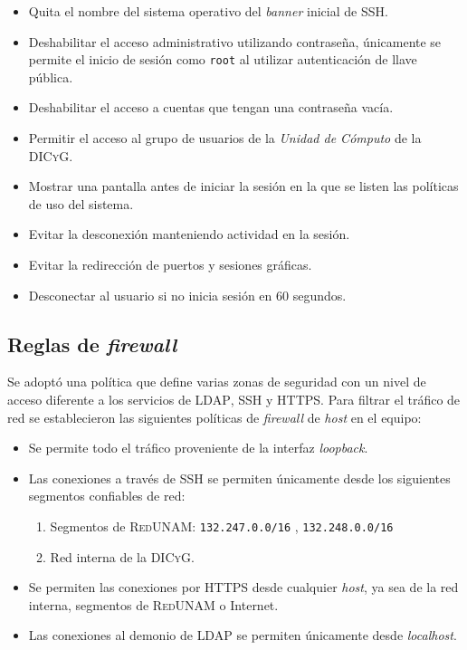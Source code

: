 \begin{itemize}
  \item Quita el nombre del sistema operativo del \textit{banner} inicial de \textsc{SSH}.
  \item Deshabilitar el acceso administrativo utilizando contrase\~{n}a, \'{u}nicamente se permite el inicio de sesi\'{o}n como \texttt{root} al utilizar autenticaci\'{o}n de llave p\'{u}blica.
  \item Deshabilitar el acceso a cuentas que tengan una contrase\~{n}a vac\'{i}a.
  \item Permitir el acceso al grupo de usuarios de la \emph{Unidad de C\'{o}mputo} de la \textsc{DICyG}.
  \item  Mostrar una pantalla antes de iniciar la sesi\'{o}n en la que se listen las pol\'{i}ticas de uso del sistema.
  \item Evitar la desconexi\'{o}n manteniendo actividad en la sesi\'{o}n.
  \item Evitar la redirecci\'{o}n de puertos y sesiones gr\'{a}ficas.
  \item Desconectar al usuario si no inicia sesi\'{o}n en 60 segundos.
\end{itemize}

      \subsection {Reglas de \textit{firewall}}
      \label{subsec:fw-rules}

Se adopt\'{o} una pol\'{i}tica que define varias zonas de seguridad con un nivel de acceso diferente a los servicios de \textsc{LDAP}, \textsc{SSH} y \textsc{HTTPS}. Para filtrar el tr\'{a}fico de red se establecieron las siguientes pol\'{i}ticas de \textit{firewall} de \textit{host} en el equipo:

\begin{itemize}
  \item Se permite todo el tr\'{a}fico proveniente de la interfaz \textit{loopback}.
  \item Las conexiones a trav\'{e}s de \textsc{SSH} se permiten \'{u}nicamente desde los siguientes segmentos confiables de red:
  \begin{enumerate}
    \item Segmentos de \textsc{RedUNAM}: \texttt{132.247.0.0/16} , \texttt{132.248.0.0/16}
    \item Red interna de la \textsc{DICyG}.
  \end{enumerate}
  \item Se permiten las conexiones por \textsc{HTTPS} desde cualquier \textit{host}, ya sea de la red interna, segmentos de \textsc{RedUNAM} o Internet.
  \item Las conexiones al demonio de \textsc{LDAP} se permiten \'{u}nicamente desde \textit{localhost}.
\end{itemize}

